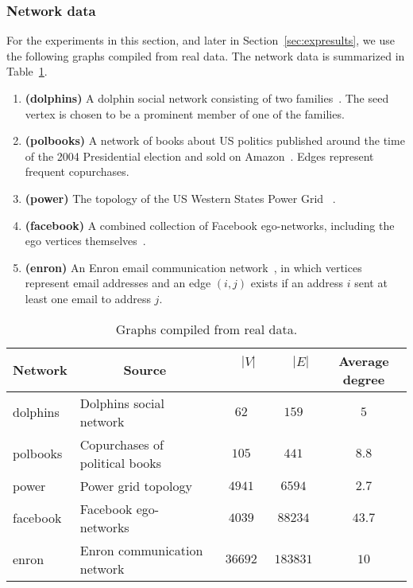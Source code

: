 \documentclass[runningheads,a4paper]{llncs}
\begin{document}
\subsubsection{Network data}
For the experiments in this section, and later in Section~\ref{sec:expresults},
we use the following graphs compiled from real data.  The network data is
summarized in Table~\ref{table:realgraphs}.

\begin{enumerate}
\item \textbf{(dolphins)} A dolphin social network consisting of two
families~\cite{dolphins}.  The seed vertex is chosen to be a prominent member of
one of the families.\label{pt:dolphins}
\item \textbf{(polbooks)} A network of books about US politics published around
the time of the 2004 Presidential election and sold on Amazon~\cite{polbooks}.
Edges represent frequent copurchases.\label{pt:polbooks}
\item \textbf{(power)} The topology of the US Western States Power Grid
~\cite{powergrid}.\label{pt:powergrid}
\item \textbf{(facebook)} A combined collection of Facebook ego-networks,
including the ego vertices themselves~\cite{facebook}.\label{pt:facebook}
\item \textbf{(enron)} An Enron email communication network~\cite{enron},
in which vertices represent email addresses and an edge $(i,j)$ exists if an
address $i$ sent at least one email to address $j$.\label{pt:enron}
\end{enumerate}

\begin{table}
\centering
\begin{tabular}{|p{2cm}|l|c|c|c|}
\hline
\multicolumn{1}{|c|}{Network} & \multicolumn{1}{|c|}{Source} & ~~$|V|$~~ & ~~$|E|$~~ & Average degree\\
\hline\hline
dolphins & Dolphins social network~\cite{dolphins} & $62$ & $159$ & $5$\\\hline
polbooks & Copurchases of political books~\cite{polbooks} & $105$ & $441$ &
$8.8$\\\hline
power & Power grid topology~\cite{powergrid} & $4941$ & $6594$ & $2.7$\\\hline
facebook & Facebook ego-networks~\cite{facebook} & $4039$ & $88234$ &
$43.7$\\\hline
enron & Enron communication network~\cite{enron} & $36692$ & $183831$ &
$10$\\
\hline
\end{tabular}
\caption{Graphs compiled from real data.}
\label{table:realgraphs}
\end{table}
\end{document}
